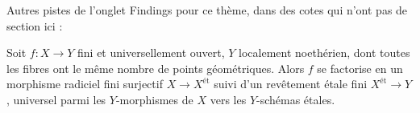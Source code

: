\bigskip
\noindent Autres pistes de l'onglet Findings pour ce thème, dans des cotes qui n'ont pas de section ici :\par

\begin{encadre}
\begin{theoreme*}
Soit $f : X \to Y$ fini et universellement ouvert, $Y$ localement noethérien, dont toutes les fibres ont le même nombre de points géométriques. Alors $f$ se factorise en un morphisme radiciel fini surjectif $X \to X^{\text{ét}}$ suivi d'un revêtement étale fini $X^{\text{ét}} \to Y$, universel parmi les $Y$-morphismes de $X$ vers les $Y$-schémas étales.
\end{theoreme*}
\end{encadre}
